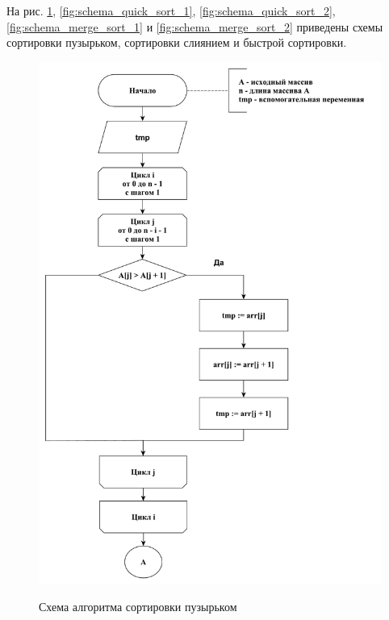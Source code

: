 \documentclass[a4paper,12pt]{article}
\begin{document}
        На рис. \ref{fig:schema_bubble_sort}, \ref{fig:schema_quick_sort_1},  \ref{fig:schema_quick_sort_2},  \ref{fig:schema_merge_sort_1} и \ref{fig:schema_merge_sort_2} приведены схемы сортировки пузырьком, сортировки слиянием и быстрой сортировки.
        
        \begin{figure}[h!]
        	\begin{center}
        		{\includegraphics[scale = 0.45]{schema01.pdf}}
        		\caption{Схема алгоритма сортировки пузырьком}
        		\label{fig:schema_bubble_sort}
        	\end{center}
        \end{figure}
        
\end{document}

